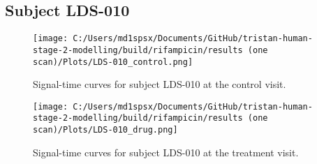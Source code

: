\documentclass{epflreport}%
\begin{document}
\subsection{Subject LDS{-}010}%
\label{subsec:SubjectLDS{-}010}%

%


\begin{figure}[h!]%
\centering%
\texttt{[image: C:/Users/md1spsx/Documents/GitHub/tristan-human-stage-2-modelling/build/rifampicin/results (one scan)/Plots/LDS-010\_control.png]}%
\caption{Signal{-}time curves for subject LDS{-}010 at the control visit.}%
\end{figure}

%


\begin{figure}[h!]%
\centering%
\texttt{[image: C:/Users/md1spsx/Documents/GitHub/tristan-human-stage-2-modelling/build/rifampicin/results (one scan)/Plots/LDS-010\_drug.png]}%
\caption{Signal{-}time curves for subject LDS{-}010 at the treatment visit.}%
\end{figure}
\end{document}
